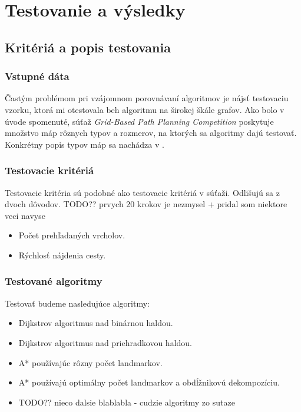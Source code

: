 \chapter{Testovanie a výsledky}

\section{Kritériá a popis testovania}
\subsection{Vstupné dáta}
Častým problémom pri vzájomnom porovnávaní algoritmov je
nájsť testovaciu vzorku, ktorá mi otestovala beh algoritmu na širokej škále grafov.
Ako bolo v úvode spomenuté, súťaž {\sl Grid-Based Path Planning Competition} poskytuje množstvo máp rôznych typov a rozmerov,
na ktorých sa algoritmy dajú testovať. Konkrétny popis typov máp sa nachádza v \cite{sturtevant2012benchmarks}.

\subsection{Testovacie kritériá}
Testovacie kritéria sú podobné ako testovacie kritériá v súťaži. 
Odlišujú sa z dvoch dôvodov. TODO?? prvych 20 krokov je nezmysel + pridal som niektore veci navyse

\begin{itemize}
\item Počet prehľadaných vrcholov.
\item Rýchlosť nájdenia cesty.
\end{itemize}


\subsection{Testované algoritmy}
Testovať budeme nasledujúce algoritmy:
\begin{itemize}
\item Dijkstrov algoritmus nad binárnou haldou.
\item Dijkstrov algoritmus nad priehradkovou haldou.
\item A* používajúc rôzny počet landmarkov.
\item A* používajú optimálny počet landmarkov a obdĺžnikovú dekompozíciu.
\item TODO?? nieco dalsie blablabla - cudzie algoritmy zo sutaze
\end{itemize}


